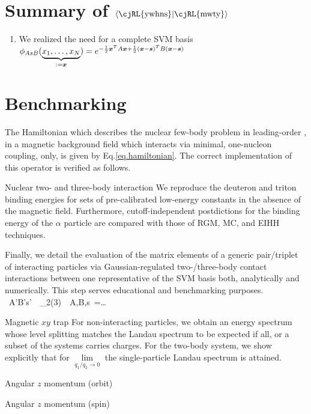 \documentclass[aps,prd,onecolumn
,tightenlines,letterpaper,notitlepage,
nofootinbib]{revtex4-1}
\begin{document}
\pacs{}

\maketitle

\section{Summary of $\langle\text{\cjRL{ywhns}}\vert\text{\cjRL{mwty}}\rangle$}

\begin{enumerate}
\item We realized the need for a complete SVM basis $\phi_{AsB}(\underbrace{x_1,\ldots,x_N}_{:=\boldsymbol{x}})=e^{-\frac{1}{2}\boldsymbol{x}^TA\boldsymbol{x}+\frac{1}{2}(\boldsymbol{x}-\boldsymbol{s})^TB(\boldsymbol{x}-\boldsymbol{s})}$

\end{enumerate}

\section{Benchmarking}

The Hamiltonian which describes the nuclear few-body problem in leading-order
\eftnopi, in a magnetic background field which interacts via minimal, one-nucleon
coupling, only, is given by Eq.\eqref{eq.hamiltonian}. The correct implementation of
this operator is verified as follows.

\begin{description}
\item{Nuclear two- and three-body interaction} We reproduce the deuteron and triton binding energies for sets of
pre-calibrated low-energy constants in the absence of the magnetic field. Furthermore, cutoff-independent postdictions
for the binding energy of the $\alpha$ particle are compared with those of RGM, MC, and EIHH techniques.

Finally, we detail the evaluation of the matrix elements of a generic pair/triplet of interacting
particles via Gaussian-regulated two-/three-body contact interactions between one representative of
the SVM basis both, analytically and numerically. This step serves educational and benchmarking purposes.
\be{}
\bra~A'B's'~\vert~_{2(3)}~\vert~A,B,s~\ket=\ldots{}
\ee

\item{Magnetic $xy$ trap} For non-interacting particles, we obtain an energy spectrum whose level splitting
matches the Landau spectrum to be expected if all, or a subset of the systems carries charges. For the two-body system,
we show explicitly that for $\lim\limits_{q_1/q_2\to 0}$ the single-particle Landau spectrum is attained.

\item{Angular $z$ momentum (orbit)}


\item{Angular $z$ momentum (spin)}

\end{description}
\end{document}
